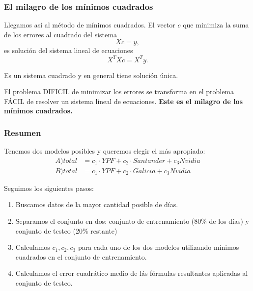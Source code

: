 \documentclass[aspectratio=169,12pt]{beamer}
\begin{document}

\begin{frame}
\frametitle{El milagro de los mínimos cuadrados}

Llegamos así al método de mínimos cuadrados. El vector $c$ que  minimiza la suma de los errores al cuadrado del sistema
$$ X c = y,$$
es solución del sistema lineal de ecuaciones
$$ X^T X c = X^T y.$$

Es un sistema cuadrado y en general tiene solución única. 

El problema DIFICIL de minimizar los errores se transforma en el problema FÁCIL de resolver un sistema lineal de ecuaciones. \textbf{Este es el milagro de los mínimos cuadrados.}

\end{frame}


\begin{frame}
\frametitle{Resumen}

Tenemos dos modelos posibles y queremos elegir el más apropiado:
\begin{align*}
A) total &= c_1 \cdot YPF + c_2 \cdot Santander + c_3 Nvidia \\
B) total &= c_1 \cdot YPF + c_2 \cdot Galicia + c_3 Nvidia
\end{align*}

Seguimos los siguientes pasos:
\begin{enumerate}
\item Buscamos datos de la mayor cantidad posible de días.
\item Separamos el conjunto en dos: conjunto de entrenamiento ($80\%$ de los días) y conjunto de testeo ($20\%$ restante)
\item Calculamos $c_1, c_2, c_3$ para cada uno de los dos modelos utilizando mínimos cuadrados en el conjunto de entrenamiento.
\item Calculamos el error cuadrático medio de lás fórmulas resultantes aplicadas al conjunto de testeo.
\end{enumerate}

\end{frame}

\end{document}
